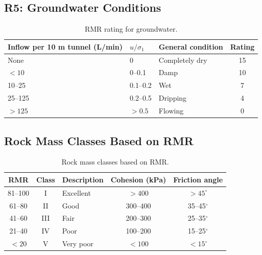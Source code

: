 \documentclass[a4paper,12pt]{article}
\begin{document}
\subsection{R5: Groundwater Conditions}

\begin{table}[H]
\centering
\small
\begin{tabularx}{\textwidth}{l l l c}
\toprule
\textbf{Inflow per 10 m tunnel (L/min)} & \textbf{\(u/\sigma_1\)} & \textbf{General condition} & \textbf{Rating} \\
\midrule
None & 0 & Completely dry & 15 \\
\(<10\) & 0--0.1 & Damp & 10 \\
10--25 & 0.1--0.2 & Wet & 7 \\
25--125 & 0.2--0.5 & Dripping & 4 \\
\(>125\) & \(>0.5\) & Flowing & 0 \\
\bottomrule
\end{tabularx}
\caption{RMR rating for groundwater.}
\label{tab:rmr_groundwater}
\end{table}

\subsection{Rock Mass Classes Based on RMR}

\begin{table}[H]
\centering
\small
\begin{tabular}{c c l c c}
\toprule
\textbf{RMR} & \textbf{Class} & \textbf{Description} & \textbf{Cohesion (kPa)} & \textbf{Friction angle} \\
\midrule
81--100 & I & Excellent & \(>400\) & \(>45^\circ\) \\
61--80  & II & Good      & 300--400 & 35--45\(^{\circ}\) \\
41--60  & III & Fair      & 200--300 & 25--35\(^{\circ}\) \\
21--40  & IV & Poor      & 100--200 & 15--25\(^{\circ}\) \\
\(<20\) & V & Very poor & \(<100\) & \(<15^\circ\) \\
\bottomrule
\end{tabular}
\caption{Rock mass classes based on RMR.}
\label{tab:rmr_classes}
\end{table}

\end{document}
